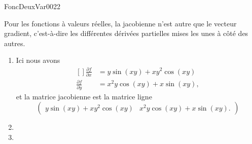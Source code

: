 
\begin{corrige}{FoncDeuxVar0022}

	Pour les fonctions à valeurs réelles, la jacobienne n'est autre que le vecteur gradient, c'est-à-dire les différentes dérivées partielles mises les unes à côté des autres.
	\begin{enumerate}

		\item
			Ici nous avons
			\begin{equation}
				\begin{aligned}[]
					\frac{ \partial f }{ \partial x }&=y\sin(xy)+xy^2\cos(xy)\\
					\frac{ \partial f }{ \partial y }&=x^2y\cos(xy)+x\sin(xy),
				\end{aligned}
			\end{equation}
			et la matrice jacobienne est la matrice ligne 
			\begin{equation}
				\begin{pmatrix} 
					y\sin(xy)+xy^2\cos(xy)	&	x^2y\cos(xy)+x\sin(xy).	
				\end{pmatrix}
			\end{equation}
		\item
		\item

	\end{enumerate}
	

\end{corrige}
